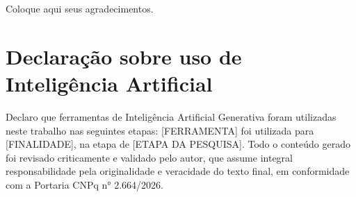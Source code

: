 \documentclass[10pt,conference]{IEEEtran}
\begin{document}
Coloque aqui seus agradecimentos.


\section*{Declaração sobre uso de Inteligência Artificial}

Declaro que ferramentas de Inteligência Artificial Generativa foram utilizadas neste trabalho nas seguintes etapas: [FERRAMENTA] foi utilizada para [FINALIDADE], na etapa de [ETAPA DA PESQUISA].
Todo o conteúdo gerado foi revisado criticamente e validado pelo autor, que assume integral responsabilidade pela originalidade e veracidade do texto final, em conformidade com  a Portaria CNPq n° 2.664/2026.





%
%





\end{document}
